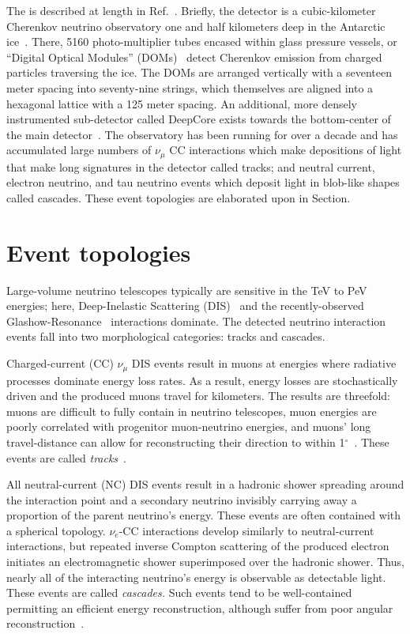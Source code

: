 \documentclass[main.tex]{subfiles}
\begin{document}
The  is described at length in Ref.~\cite{Aartsen_2017}. Briefly, the detector is a cubic-kilometer Cherenkov neutrino observatory one and half kilometers deep in the Antarctic ice~\cite{Aartsen_2017}.
There, 5160 photo-multiplier tubes encased within glass pressure vessels, or ``Digital Optical Modules'' (DOMs)~\cite{ABBASI2009294} detect Cherenkov emission from charged particles traversing the ice.
The DOMs are arranged vertically with a seventeen meter spacing into seventy-nine strings, which themselves are aligned into a hexagonal lattice with a 125 meter spacing. 
An additional, more densely instrumented sub-detector called DeepCore exists towards the bottom-center of the main detector~\cite{ABBASI2012615}.
The observatory has been running for over a decade and has accumulated large numbers of $\nu_{\mu}$ CC interactions which make depositions of light that make long signatures in the detector called tracks; and neutral current, electron neutrino, and tau neutrino events which deposit light in blob-like shapes called cascades. These event topologies are elaborated upon in Section. %

\section{Event topologies}

Large-volume neutrino telescopes typically are sensitive in the TeV to PeV energies; here, Deep-Inelastic Scattering (DIS)~\cite{gandhineutrinos} and the recently-observed~\cite{IceCube:2021rpz} Glashow-Resonance~\cite{PhysRev.118.316} interactions dominate. 
The detected neutrino interaction events fall into two morphological categories: tracks and cascades.

Charged-current (CC) $\nu_{\mu}$ DIS events result in muons at energies where radiative processes dominate energy loss rates.
As a result, energy losses are stochastically driven and the produced muons travel for kilometers. 
The results are threefold: muons are difficult to fully contain in neutrino telescopes, muon energies are poorly correlated with progenitor muon-neutrino energies, and muons' long travel-distance can allow for reconstructing their direction to within 1$^{\circ}$~\cite{trackaccuracy2017}. These events are called \textit{tracks}~\cite{icecube_energy_reco}.

All neutral-current (NC) DIS events result in a hadronic shower spreading around the interaction point and a secondary neutrino invisibly carrying away a proportion of the parent neutrino's energy. 
These events are often contained with a spherical topology. 
$\nu_{e}$-CC interactions develop similarly to neutral-current interactions, but repeated inverse Compton scattering of the produced electron initiates an electromagnetic shower superimposed over the hadronic shower. 
Thus, nearly all of the interacting neutrino's energy is observable as detectable light. 
These events are called \textit{cascades.} Such events tend to be well-contained permitting an efficient energy reconstruction, although suffer from poor angular reconstruction~\cite{icecube_energy_reco}. 
\end{document}
